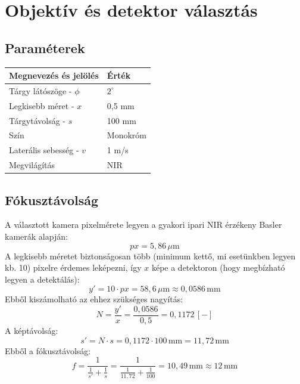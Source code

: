 \section{Objektív és detektor választás}

\subsection{Paraméterek}
\begin{table}[H]
    \centering
    \begin{tabular}{ll}
        \toprule
        \textbf{Megnevezés és jelölés} & \textbf{Érték} \\
        \midrule
        Tárgy látószöge - $\phi$       & $2^\circ$      \\
        Legkisebb méret - $x$          & 0,5 mm         \\
        Tárgytávolság - $s$            & 100 mm         \\
        Szín                           & Monokróm       \\
        Laterális sebesség - $v$       & 1 m/s          \\
        Megvilágítás                   & NIR            \\
        \bottomrule
    \end{tabular}
\end{table}

\subsection{Fókusztávolság}

A választott kamera pixelmérete legyen a gyakori ipari NIR érzékeny Basler kamerák alapján:
\begin{equation}
    px = 5{,}86 \, \mu\text{m}
\end{equation}
A legkisebb méretet biztonságosan több (minimum kettő, mi esetünkben legyen kb. 10) pixelre érdemes leképezni, így $x$ képe a detektoron (hogy megbízható legyen a detektálás):
\begin{equation}
    y' = 10 \cdot px = 58{,}6 \, \mu\text{m} \approx 0{,}0586 \, \text{mm}
\end{equation}
Ebből kiszámolható az ehhez szükséges nagyítás:
\begin{equation}
    N = \frac{y'}{x} = \frac{0{,}0586}{0{,}5} = 0{,}1172 \, [-]
\end{equation}
A képtávolság:
\begin{equation}
    s' = N \cdot s = 0{,}1172 \cdot 100 \, \text{mm} = 11{,}72 \, \text{mm}
\end{equation}
Ebből a fókusztávolság:
\begin{equation}
    f = \frac{1}{\frac{1}{s'} + \frac{1}{s}} = \frac{1}{\frac{1}{11{,}72} + \frac{1}{100}} = 10{,}49 \, \text{mm} \approx 12 \, \text{mm}
\end{equation}


